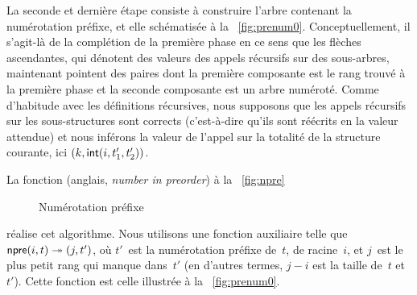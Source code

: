 La seconde et dernière étape consiste à construire l'arbre contenant
la numérotation préfixe, et elle schématisée à la
\fig~\vref{fig:prenum0}. Conceptuellement, il s'agit-là de la
complétion de la première phase en ce sens que les flèches
ascendantes, qui dénotent des valeurs des appels récursifs sur des
sous-arbres, maintenant pointent des paires dont la première
composante est le rang trouvé à la première phase et la seconde
composante est un arbre numéroté. Comme d'habitude avec les
définitions récursives, nous supposons que les appels récursifs sur
les sous-structures sont corrects (c'est-à-dire qu'ils sont réécrits
en la valeur attendue) et nous inférons la valeur de l'appel sur la
totalité de la structure courante, ici
\(({k},{\textsf{int}(i,t'_1,t'_2)})\).

La fonction  (anglais,
\emph{number in preorder}) à la \fig~\vref{fig:npre}
\begin{figure}[t]
\abovedisplayskip=0pt
\belowdisplayskip=0pt
\centering
{}
\caption{Numérotation préfixe\label{fig:npre}}
\end{figure}
réalise cet algorithme. Nous utilisons une fonction auxiliaire
 telle que \(\textsf{npre}(i,t)
\twoheadrightarrow ({j},{t'})\), où \(t'\)~est la numérotation
préfixe de~\(t\), de racine~\(i\), et \(j\)~est le plus petit rang qui
manque dans~\(t'\) (en d'autres termes, \(j-i\) est la taille de~\(t\)
et~\(t'\)). Cette fonction est celle illustrée à la
\fig~\vref{fig:prenum0}.

